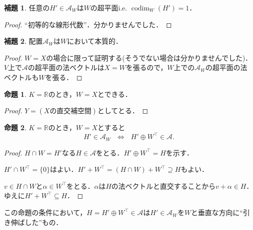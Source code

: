 \documentclass[xelatex,ja=standard,a4paper,14pt,everyparhook=compat]{bxjsarticle}
\newcommand{\bbR}{\mathbb{R}}
\newcommand{\mcA}{\mathcal{A}}
\DeclareMathOperator{\codim}{codim}
\theoremstyle{definition}
\newtheorem*{lemma*}{補題}
\newtheorem*{proposition*}{命題}
\begin{document}
\begin{lemma*}
    任意の$H' \in \mcA_W$は$W$の超平面i.e. $\codim_W(H') = 1$．
\end{lemma*}
\begin{proof}
    ``初等的な線形代数''．分かりませんでした．
\end{proof}

\begin{lemma*}
    配置$\mcA_W$は$W$において本質的．
\end{lemma*}
\begin{proof}
    $W=X$の場合に限って証明する(そうでない場合は分かりませんでした)．
    $V$上で$\mcA$の超平面の法ベクトルは$X=W$を張るので，$W$上での$\mcA_W$の超平面の法ベクトルも$W$を張る．
\end{proof}

\begin{proposition*}
    $K = \bbR$のとき，$W = X$とできる．
\end{proposition*}
\begin{proof}
    $Y = (\text{$X$の直交補空間})$としてとる．
\end{proof}

\begin{proposition*}
    $K = \bbR$のとき，$W=X$とすると \begin{equation*}
        \text{$H' \in \mcA_W$ $\Longleftrightarrow$ $H' \oplus W^\top \in \mcA$.}
    \end{equation*}
\end{proposition*}
\begin{proof}
    $H \cap W = H'$なる$H \in \mcA$をとる．$H' \oplus W^\top = H$を示す．

    $H' \cap W^\top = \{0\}$はよい．$H' + W^\top = (H \cap W) + W^\top \supseteq H$もよい．

    $v \in H \cap W$と$\alpha \in W^\top$をとる．$\alpha$は$H$の法ベクトルと直交することから$v + \alpha \in H$．ゆえに$H'+W^\top \subseteq H$．
\end{proof}

この命題の条件において，$H = H' \oplus W^\top \in \mcA$は$H' \in \mcA_W$を$W$と垂直な方向に``引き伸ばした''もの．
\end{document}
